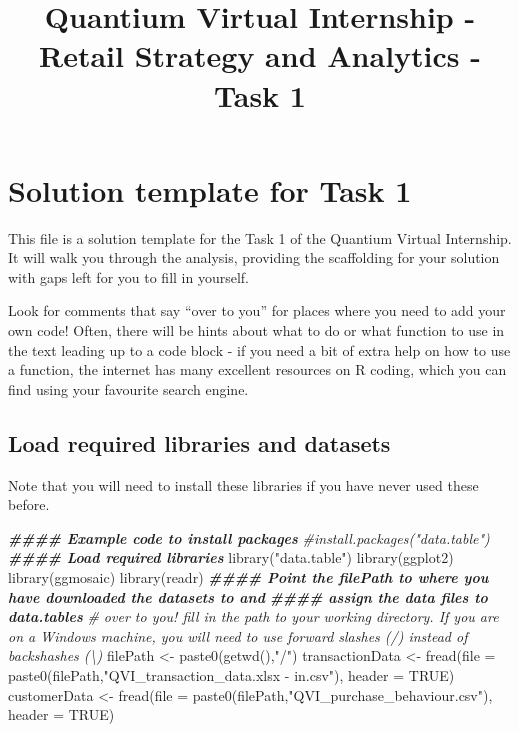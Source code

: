 \documentclass[
]{article}
\title{Quantium Virtual Internship - Retail Strategy and Analytics -
Task 1}
\author{}
\date{\vspace{-2.5em}}
\newenvironment{Shaded}{\begin{snugshade}}{\end{snugshade}}
\newcommand{\AttributeTok}[1]{\textcolor[rgb]{0.77,0.63,0.00}{#1}}
\newcommand{\CommentTok}[1]{\textcolor[rgb]{0.56,0.35,0.01}{\textit{#1}}}
\newcommand{\ConstantTok}[1]{\textcolor[rgb]{0.00,0.00,0.00}{#1}}
\newcommand{\DocumentationTok}[1]{\textcolor[rgb]{0.56,0.35,0.01}{\textbf{\textit{#1}}}}
\newcommand{\FunctionTok}[1]{\textcolor[rgb]{0.00,0.00,0.00}{#1}}
\newcommand{\NormalTok}[1]{#1}
\newcommand{\OtherTok}[1]{\textcolor[rgb]{0.56,0.35,0.01}{#1}}
\newcommand{\StringTok}[1]{\textcolor[rgb]{0.31,0.60,0.02}{#1}}
\begin{document}
\maketitle

\hypertarget{solution-template-for-task-1}{%
\section{Solution template for Task
1}\label{solution-template-for-task-1}}

This file is a solution template for the Task 1 of the Quantium Virtual
Internship. It will walk you through the analysis, providing the
scaffolding for your solution with gaps left for you to fill in
yourself.

Look for comments that say ``over to you'' for places where you need to
add your own code! Often, there will be hints about what to do or what
function to use in the text leading up to a code block - if you need a
bit of extra help on how to use a function, the internet has many
excellent resources on R coding, which you can find using your favourite
search engine.

\hypertarget{load-required-libraries-and-datasets}{%
\subsection{Load required libraries and
datasets}\label{load-required-libraries-and-datasets}}

Note that you will need to install these libraries if you have never
used these before.

\begin{Shaded}
\begin{Highlighting}[]
\DocumentationTok{\#\#\#\# Example code to install packages}
\CommentTok{\#install.packages("data.table")}
\DocumentationTok{\#\#\#\# Load required libraries}
\FunctionTok{library}\NormalTok{(}\StringTok{"data.table"}\NormalTok{)}
\FunctionTok{library}\NormalTok{(ggplot2)}
\FunctionTok{library}\NormalTok{(ggmosaic)}
\FunctionTok{library}\NormalTok{(readr)}
\DocumentationTok{\#\#\#\# Point the filePath to where you have downloaded the datasets to and }
\DocumentationTok{\#\#\#\# assign the data files to data.tables}
\CommentTok{\# over to you! fill in the path to your working directory. If you are on a Windows machine, you will need to use forward slashes (/) instead of backshashes (\textbackslash{})}
\NormalTok{filePath }\OtherTok{\textless{}{-}} \FunctionTok{paste0}\NormalTok{(}\FunctionTok{getwd}\NormalTok{(),}\StringTok{"/"}\NormalTok{)}
\NormalTok{transactionData }\OtherTok{\textless{}{-}} \FunctionTok{fread}\NormalTok{(}\AttributeTok{file =} \FunctionTok{paste0}\NormalTok{(filePath,}\StringTok{"QVI\_transaction\_data.xlsx {-} in.csv"}\NormalTok{), }\AttributeTok{header =} \ConstantTok{TRUE}\NormalTok{)}
\NormalTok{customerData }\OtherTok{\textless{}{-}} \FunctionTok{fread}\NormalTok{(}\AttributeTok{file =} \FunctionTok{paste0}\NormalTok{(filePath,}\StringTok{"QVI\_purchase\_behaviour.csv"}\NormalTok{), }\AttributeTok{header =} \ConstantTok{TRUE}\NormalTok{)}
\end{Highlighting}
\end{Shaded}
\end{document}
